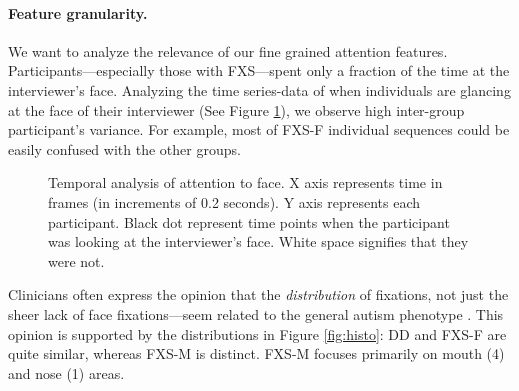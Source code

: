 \documentclass{llncs}
\begin{document}
\paragraph{Feature granularity.} We want to analyze the relevance of our fine grained attention features.
Participants---especially those with FXS---spent only a fraction of the time at the interviewer's face. Analyzing the time series-data of when individuals are glancing at the face of their interviewer (See Figure \ref{fig:sticky}), we observe high inter-group participant's variance. For example, most of FXS-F individual sequences could be easily confused with the other groups.
   \begin{figure}[t]
     \hfill
     \hfill
     \centering
  
     \caption{Temporal analysis of attention to face. X axis represents time in frames (in increments of 0.2 seconds). Y axis represents each participant. Black dot represent time points when the participant was looking at the interviewer's face. White space signifies that they were not.}
    \label{fig:sticky}
   \end{figure}
Clinicians often express the opinion that the \emph{distribution} of fixations, not just the sheer lack of face fixations---seem related to the general autism phenotype \cite{klin2002,jones2013}. This opinion is supported by the distributions in Figure \ref{fig:histo}: DD and FXS-F are quite similar, whereas FXS-M is distinct. FXS-M focuses primarily on mouth (4) and nose (1) areas.
  
\end{document}
